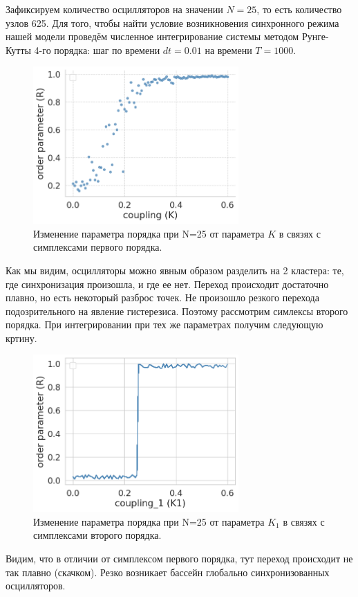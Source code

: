 Зафиксируем количество осцилляторов на значении $N=25$, то есть количество узлов 625.
Для того, чтобы найти условие возникновения синхронного режима нашей модели проведём численное интегрирование системы методом Рунге-Кутты 4-го порядка: шаг по времени $dt=0.01$ на времени $T=1000$.
 \begin{figure}
\center\includegraphics[height=6cm]{aRyabovris3.png}
 \caption{Изменение параметра порядка при N=25 от параметра $K $ в  связях с симплексами первого порядка.}
\end{figure}

Как мы видим, осцилляторы можно явным образом разделить на 2 кластера: те, где синхронизация произошла, и где ее нет. Переход происходит достаточно плавно, но есть некоторый разброс точек. Не произошло резкого перехода подозрительного на явление гистерезиса. Поэтому рассмотрим симлексы второго порядка.
При интегрировании при тех же параметрах получим следующую кртину.
 \begin{figure}
\center\includegraphics[height=6cm]{aRyabovris2.png}
 \caption{Изменение параметра порядка при N=25 от параметра $K_1$ в  связях с симплексами второго порядка.}
\end{figure}

Видим, что в отличии от симплексом первого порядка, тут переход происходит не так плавно (скачком). Резко возникает бассейн глобально синхронизованных осцилляторов. 

